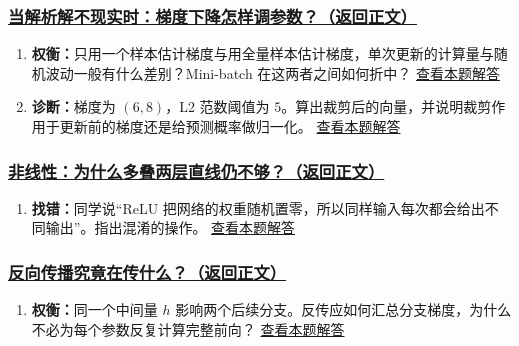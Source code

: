 \subsubsection*{\hyperref[check:16-loss-gradient]{当解析解不现实时：梯度下降怎样调参数？（返回正文）}}\begin{enumerate}[label={},leftmargin=4.8em,itemsep=4pt]
\item[\textbf{C4-4.}] \label{exercise:C4-4}\label{extension:16-loss-gradient:4}\textbf{权衡：}只用一个样本估计梯度与用全量样本估计梯度，单次更新的计算量与随机波动一般有什么差别？Mini-batch 在这两者之间如何折中？ \hyperref[answerpiece:16-loss-gradient:4]{查看本题解答}
\item[\textbf{C4-5.}] \label{exercise:C4-5}\label{extension:16-loss-gradient:5}\textbf{诊断：}梯度为 $(6,8)$，L2 范数阈值为 $5$。算出裁剪后的向量，并说明裁剪作用于更新前的梯度还是给预测概率做归一化。 \hyperref[answerpiece:16-loss-gradient:5]{查看本题解答}
\end{enumerate}

\subsubsection*{\hyperref[check:07-functions-relu]{非线性：为什么多叠两层直线仍不够？（返回正文）}}\begin{enumerate}[label={},leftmargin=4.8em,itemsep=4pt]
\item[\textbf{C4-6.}] \label{exercise:C4-6}\label{extension:07-functions-relu:4}\textbf{找错：}同学说“ReLU 把网络的权重随机置零，所以同样输入每次都会给出不同输出”。指出混淆的操作。 \hyperref[answerpiece:07-functions-relu:4]{查看本题解答}
\end{enumerate}

\subsubsection*{\hyperref[check:17-backpropagation]{反向传播究竟在传什么？（返回正文）}}\begin{enumerate}[label={},leftmargin=4.8em,itemsep=4pt]
\item[\textbf{C4-7.}] \label{exercise:C4-7}\label{extension:17-backpropagation:4}\textbf{权衡：}同一个中间量 $h$ 影响两个后续分支。反传应如何汇总分支梯度，为什么不必为每个参数反复计算完整前向？ \hyperref[answerpiece:17-backpropagation:4]{查看本题解答}
\end{enumerate}

